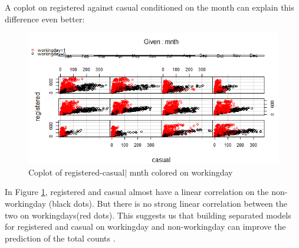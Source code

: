 \documentclass[12pt]{article}
\begin{document}
	 A coplot on registered against casual conditioned on the month can explain this difference even better:
	 	\begin{figure}[H]
	 		\centering
	 		\includegraphics[scale=.9]{figures/coplot_registered_casual_mnth.png}
	 		\caption{Coplot of registered-casual$|$ mnth colored on workingday}
	 		\label{fig:registered_casual}
	 	\end{figure}
	In Figure \ref{fig:registered_casual}, registered and casual almost have a linear correlation on the non-workingday (black dots). But there is no strong linear correlation between the two on workingdays(red dots). This suggests us that building separated models for registered and casual on workingday and non-workingday can improve the prediction of the total counts .
	
\end{document}
